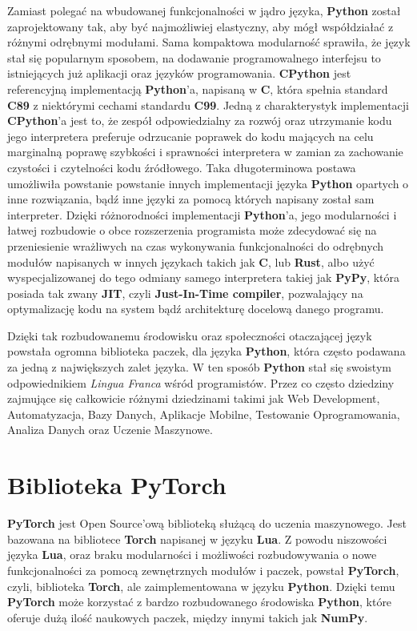 Zamiast polegać na wbudowanej funkcjonalności w jądro języka, \textbf{Python} został zaprojektowany tak, aby być najmożliwiej elastyczny, aby mógł współdziałać z różnymi odrębnymi modułami. Sama kompaktowa modularność sprawiła, że język stał się popularnym sposobem, na dodawanie programowalnego interfejsu to istniejących już aplikacji oraz języków programowania.
\textbf{CPython} jest referencyjną implementacją \textbf{Python}'a, napisaną w \textbf{C}, która spełnia standard \textbf{C89} z niektórymi cechami standardu \textbf{C99}. Jedną z charakterystyk implementacji \textbf{CPython}'a jest to, że zespół odpowiedzialny za rozwój oraz utrzymanie kodu jego interpretera preferuje odrzucanie poprawek do kodu mających na celu marginalną poprawę szybkości i sprawności interpretera w zamian za zachowanie czystości i czytelności kodu źródłowego. Taka długoterminowa postawa umożliwiła powstanie powstanie innych implementacji języka \textbf{Python} opartych o inne rozwiązania, bądź inne języki za pomocą których napisany został sam interpreter. Dzięki różnorodności implementacji \textbf{Python}'a, jego modularności i łatwej rozbudowie o obce rozszerzenia programista może zdecydować się na przeniesienie wrażliwych na czas wykonywania funkcjonalności do odrębnych modułów napisanych w innych językach takich jak \textbf{C}, lub \textbf{Rust}, albo użyć wyspecjalizowanej do tego odmiany samego interpretera takiej jak \textbf{PyPy}, która posiada tak zwany \textbf{JIT}, czyli \textbf{Just-In-Time compiler}, pozwalający na optymalizację kodu na system bądź architekturę docelową danego programu.

Dzięki tak rozbudowanemu środowisku oraz społeczności otaczającej język powstała ogromna biblioteka paczek, dla języka \textbf{Python}, która często podawana za jedną z największych zalet języka. W ten sposób \textbf{Python} stał się swoistym odpowiednikiem \textit{Lingua Franca} wśród programistów. Przez co często dziedziny zajmujące się całkowicie różnymi dziedzinami takimi jak Web Development, Automatyzacja, Bazy Danych, Aplikacje Mobilne, Testowanie Oprogramowania, Analiza Danych oraz Uczenie Maszynowe.



\section{Biblioteka PyTorch}

\textbf{PyTorch} \cite{DeepLearningWithPyTorch} \cite{PyTorchWebSite} jest Open Source'ową biblioteką służącą do uczenia maszynowego. Jest bazowana na bibliotece \textbf{Torch} napisanej w języku \textbf{Lua}. Z powodu niszowości języka \textbf{Lua}, oraz braku modularności i możliwości rozbudowywania o nowe funkcjonalności za pomocą zewnętrznych modułów i paczek, powstał \textbf{PyTorch}, czyli, biblioteka \textbf{Torch}, ale zaimplementowana w języku \textbf{Python}. Dzięki temu \textbf{PyTorch} może korzystać z bardzo rozbudowanego środowiska \textbf{Python}, które oferuje dużą ilość naukowych paczek, między innymi takich jak \textbf{NumPy}.


